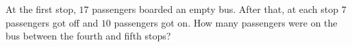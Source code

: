 At the first stop, $17$ passengers boarded an empty bus. After that, at each stop $7$ passengers got off and $10$ passengers got on. How many passengers were on the bus between the fourth and fifth stops?
